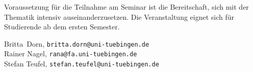 \documentclass[%
	,ngerman				
	,DIV = 15				 
	]{scrartcl}
\begin{document}
Voraussetzung für die Teilnahme am Seminar ist die Bereitschaft, sich mit der Thematik intensiv auseinanderzusetzen. 
Die Veranstaltung eignet sich für Studierende ab dem ersten Semester.

\medskip
\noindent\mbox{Britta Dorn}, \phantom{xx} \texttt{britta.dorn@uni-tuebingen.de} \\
Rainer Nagel, \phantom{x} \texttt{rana@fa.uni-tuebingen.de}\\
Stefan Teufel, \phantom{x} \texttt{stefan.teufel@uni-tuebingen.de}
\end{document}
